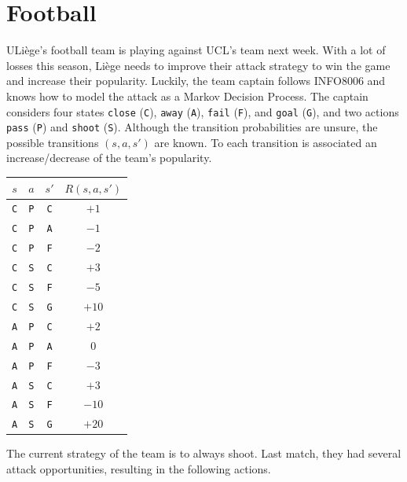 \documentclass[11pt, a4paper]{article}
\begin{document}
\newpage

\section{Football}

\def\C{\texttt{C}}
\def\A{\texttt{A}}
\def\F{\texttt{F}}
\def\G{\texttt{G}}
\def\P{\texttt{P}}
\def\S{\texttt{S}}

ULiège's football team is playing against UCL's team next week. With a lot of losses this season, Liège needs to improve their attack strategy to win the game and increase their popularity. Luckily, the team captain follows INFO8006 and knows how to model the attack as a Markov Decision Process. The captain considers four states \texttt{close} (\C), \texttt{away} (\A), \texttt{fail} (\F), and \texttt{goal} (\G), and two actions \texttt{pass} (\P) and \texttt{shoot} (\S). Although the transition probabilities are unsure, the possible transitions $(s, a, s')$ are known. To each transition is associated an increase/decrease of the team's popularity.

\begin{table}[h]
    \centering
    \begin{tabular}{ccc|c}
        \toprule
         $s$ & $a$ & $s'$ & $R(s, a, s')$ \\
         \midrule
         \C & \P & \C & $+1$ \\
         \C & \P & \A & $-1$ \\
         \C & \P & \F & $-2$ \\
         \C & \S & \C & $+3$ \\
         \C & \S & \F & $-5$ \\
         \C & \S & \G & $+10$ \\
         \midrule
         \A & \P & \C & $+2$ \\
         \A & \P & \A & $0$ \\
         \A & \P & \F & $-3$ \\
         \A & \S & \C & $+3$ \\
         \A & \S & \F & $-10$ \\
         \A & \S & \G & $+20$ \\
         \bottomrule
    \end{tabular}
\end{table}

The current strategy of the team is to always shoot. Last match, they had several attack opportunities, resulting in the following actions.
\end{document}
